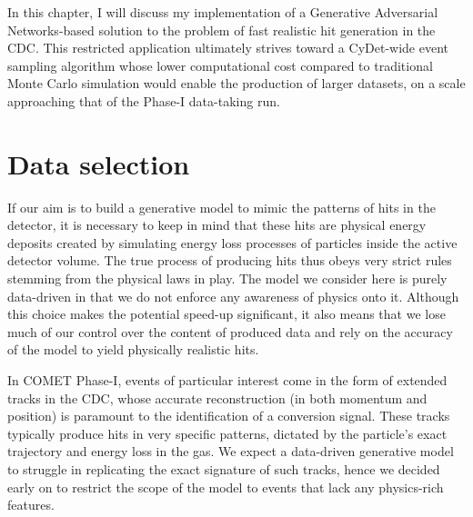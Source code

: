 In this chapter, I will discuss my implementation of a Generative Adversarial Networks-based solution to the problem of fast realistic hit generation in the CDC. This restricted application ultimately strives toward a CyDet-wide event sampling algorithm whose lower computational cost compared to traditional Monte Carlo simulation would enable the production of larger datasets, on a scale approaching that of the Phase-I data-taking run.

\section{Data selection} %
If our aim is to build a generative model to mimic the patterns of hits in the detector, it is necessary to keep in mind that these hits are physical energy deposits created by simulating energy loss processes of particles inside the active detector volume. The true process of producing hits thus obeys very strict rules stemming from the physical laws in play. The model we consider here is purely data-driven in that we do not enforce any awareness of physics onto it. Although this choice makes the potential speed-up significant, it also means that we lose much of our control over the content of produced data and rely on the accuracy of the model to yield physically realistic hits.

In COMET Phase-I, events of particular interest come in the form of extended tracks in the CDC, whose accurate reconstruction (in both momentum and position) is paramount to the identification of a conversion signal. These tracks typically produce hits in very specific patterns, dictated by the particle's exact trajectory and energy loss in the gas. We expect a data-driven generative model to struggle in replicating the exact signature of such tracks, hence we decided early on to restrict the scope of the model to events that lack any physics-rich features. 




